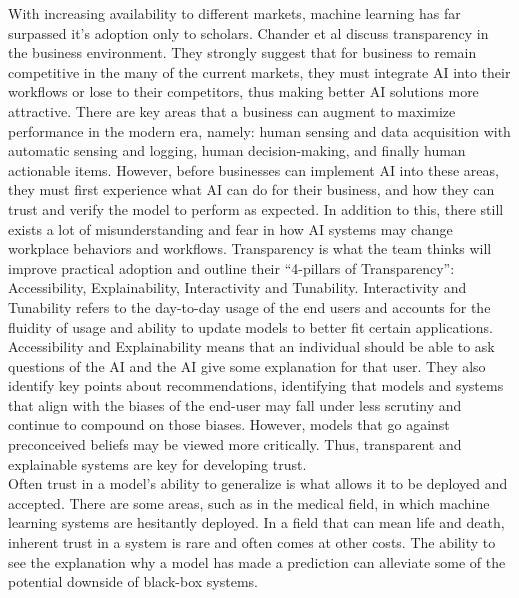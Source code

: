 \documentclass[a4paper]{article}
\begin{document}
With increasing availability to different markets, machine learning has far surpassed it's adoption only to scholars. Chander et al \cite{chander2018working} discuss transparency in the business environment. They strongly suggest that for business to remain competitive in the many of the current markets, they must integrate AI into their workflows or lose to their competitors, thus making better AI solutions more attractive. There are key areas that a business can augment to maximize performance in the modern era, namely: human sensing and data acquisition with automatic sensing and logging, human decision-making, and finally human actionable items. However, before businesses can implement AI into these areas, they must first experience what AI can do for their business, and how they can trust and verify the model to perform as expected. In addition to this, there still exists a lot of misunderstanding and fear in how AI systems may change workplace behaviors and workflows. Transparency is what the team thinks will improve practical adoption and outline their “4-pillars of Transparency”: Accessibility, Explainability, Interactivity and Tunability. Interactivity and Tunability refers to the day-to-day usage of the end users and accounts for the fluidity of usage and ability to update models to better fit certain applications. Accessibility and Explainability means that an individual should be able to ask questions of the AI and the AI give some explanation for that user. They also identify key points about recommendations, identifying that models and systems that align with the biases of the end-user may fall under less scrutiny and continue to compound on those biases. However, models that go against preconceived beliefs may be viewed more critically. Thus, transparent and explainable systems are key for developing trust. \\


Often trust in a model’s ability to generalize is what allows it to be deployed and accepted. There are some areas, such as in the medical field, in which machine learning systems are hesitantly deployed. In a field that can mean life and death, inherent trust in a system is rare and often comes at other costs. The ability to see the explanation why a model has made a prediction can alleviate some of the potential downside of black-box systems.  \\
\end{document}
